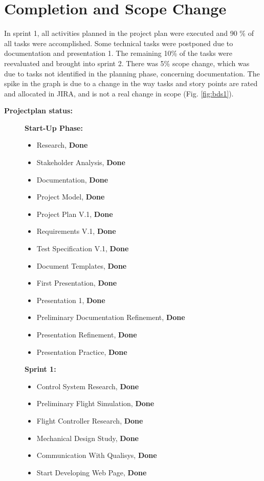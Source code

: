 \section{Completion and Scope Change}

In sprint 1, all activities planned in the project plan were executed and 90 \% of all tasks were accomplished. Some technical tasks were postponed due to documentation and presentation 1. The remaining 10\% of the tasks were reevaluated and brought into sprint 2. There was 5\% scope change, which was due to tasks not identified in the planning phase, concerning documentation. The spike in the graph is due to a change in the way tasks and story points are rated and allocated in JIRA, and is not a real change in scope (Fig. \ref{fig:bds1}). 
\bigskip

\textbf{Projectplan status:}

\begin{figure}[h]
\begin{minipage}[t]{0.5\textwidth}
\textbf{Start-Up Phase:}
\begin{itemize}
	\item Research, \textbf{Done}
	\item Stakeholder Analysis, \textbf{Done}
	\item Documentation, \textbf{Done}
	\item Project Model, \textbf{Done}
	\item Project Plan V.1, \textbf{Done}
	\item Requirements V.1, \textbf{Done}
	\item Test Specification V.1, \textbf{Done}
	\item Document Templates, \textbf{Done}
	\item First Presentation, \textbf{Done}
	\item Presentation 1, \textbf{Done}
    \item Preliminary Documentation Refinement, \textbf{Done}
	\item Presentation Refinement, \textbf{Done}
	\item Presentation Practice, \textbf{Done}
\end{itemize}
\end{minipage}
\hfill
\begin{minipage}[t]{0.5\textwidth}
\textbf{Sprint 1:}
\begin{itemize}
\item Control System Research, \textbf{Done}
    \item Preliminary Flight Simulation, \textbf{Done}
	\item Flight Controller Research, \textbf{Done}
	\item Mechanical Design Study,  \textbf{Done} 
	\item Communication With Qualisys, \textbf{Done}
	\item Start Developing Web Page, \textbf{Done}   
\end{itemize}
\end{minipage}
\hfill
\end{figure}

